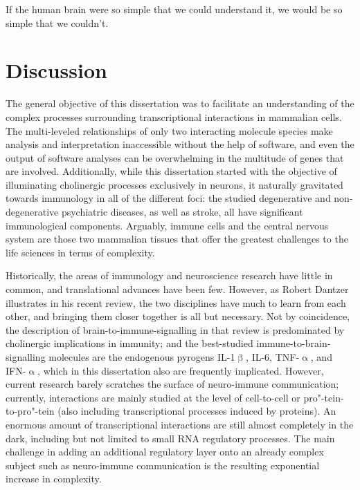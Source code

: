 \begin{savequote}[82mm]
If the human brain were so simple that we could understand it, we would be so simple that we couldn’t.
\end{savequote}

\chapter{Discussion}
The general objective of this dissertation was to facilitate an understanding of the complex processes surrounding transcriptional interactions in mammalian cells. The multi-leveled relationships of only two interacting molecule species make analysis and interpretation inaccessible without the help of software, and even the output of software analyses can be overwhelming in the multitude of genes that are involved. Additionally, while this dissertation started with the objective of illuminating cholinergic processes exclusively in neurons, it naturally gravitated towards immunology in all of the different foci: the studied degenerative and non-degenerative psychiatric diseases, as well as stroke, all have significant immunological components. Arguably, immune cells and the central nervous system are those two mammalian tissues that offer the greatest challenges to the life sciences in terms of complexity. 

Historically, the areas of immunology and neuroscience research have little in common, and translational advances have been few. However, as Robert Dantzer illustrates in his recent review,\cite{Dantzer2018} the two disciplines have much to learn from each other, and bringing them closer together is all but necessary. Not by coincidence, the description of brain-to-immune-signalling in that review is predominated by cholinergic implications in immunity; and the best-studied immune-to-brain-signalling molecules are the endogenous pyrogens IL-1$\upbeta$, IL-6, TNF-$\upalpha$, and IFN-$\upalpha$, which in this dissertation also are frequently implicated. However, current research barely scratches the surface of neuro-immune communication; currently, interactions are mainly studied at the level of cell-to-cell or pro"-tein-to-pro"-tein (also including transcriptional processes induced by proteins). An enormous amount of transcriptional interactions are still almost completely in the dark, including but not limited to small RNA regulatory processes. The main challenge in adding an additional regulatory layer onto an already complex subject such as neuro-immune communication is the resulting exponential increase in complexity.

